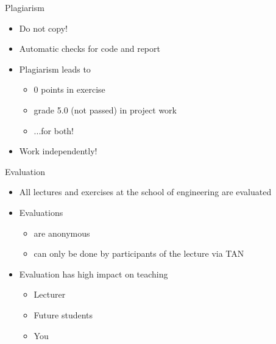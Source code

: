 \begin{frame}[c]{Plagiarism}
	\begin{itemize}
		\setlength\itemsep{0.4cm}
		\item Do not copy!
		\item Automatic checks for code and report
		\item Plagiarism leads to
		\begin{itemize}
			\item 0 points in exercise
			\item grade 5.0 (not passed) in project work
			\item ...for both!
		\end{itemize}
		\item Work independently!
	\end{itemize}
\end{frame}


\begin{frame}{Evaluation}
	\begin{itemize}
		\setlength\itemsep{0.3cm}
		\item All lectures and exercises at the school of engineering are evaluated
		\item Evaluations
		      \begin{itemize}
			      \item are anonymous
			      \item can only be done by participants of the lecture via TAN
		      \end{itemize}
		\item Evaluation has high impact on teaching
		      \begin{itemize}
			      \item Lecturer
			      \item Future students
			      \item You
		      \end{itemize}
	\end{itemize}
\end{frame}

